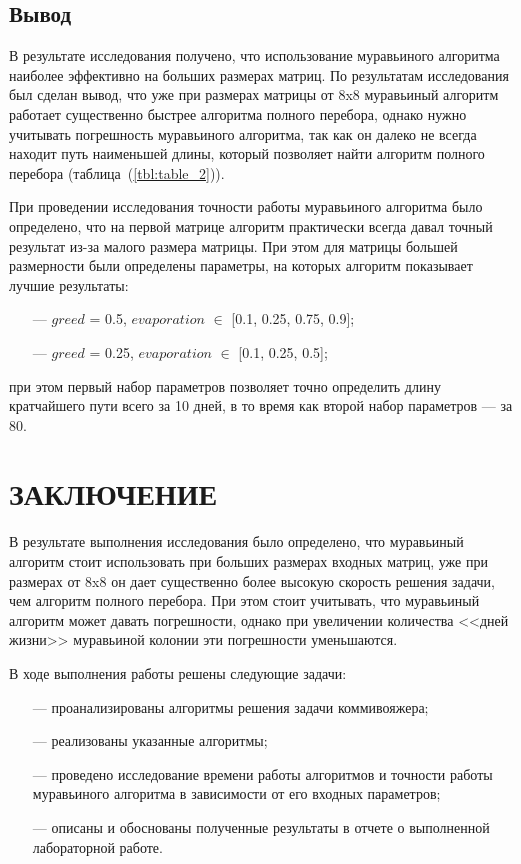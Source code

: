 \documentclass{bmstu}
\begin{document}
\section*{Вывод}
В результате исследования получено, что использование муравьиного алгоритма наиболее эффективно на больших размерах матриц. По результатам исследования был сделан вывод, что уже при размерах матрицы от 8x8 муравьиный алгоритм работает существенно быстрее алгоритма полного перебора, однако нужно учитывать погрешность муравьиного алгоритма, так как он далеко не всегда находит путь наименьшей длины, который позволяет найти алгоритм полного перебора (таблица~(\ref{tbl:table_2})).
\par При проведении исследования точности работы муравьиного алгоритма было определено, что на первой матрице алгоритм практически всегда давал точный результат из-за малого размера матрицы. При этом для матрицы большей размерности были определены параметры, на которых алгоритм показывает лучшие результаты:
\begin{itemize}
    \item [---] $greed$ = 0.5, $evaporation$ $\in$ [0.1, 0.25, 0.75, 0.9];
    \item [---] $greed$ = 0.25, $evaporation$ $\in$ [0.1, 0.25, 0.5];
\end{itemize}
при этом первый набор параметров позволяет точно определить длину кратчайшего пути всего за 10 дней, в то время как второй набор параметров --- за 80.

\chapter*{ЗАКЛЮЧЕНИЕ}

В результате выполнения исследования было определено, что муравьиный алгоритм стоит использовать при больших размерах входных матриц, уже при размерах от 8x8 он дает существенно более высокую скорость решения задачи, чем алгоритм полного перебора. При этом стоит учитывать, что муравьиный алгоритм может давать погрешности, однако при увеличении количества <<дней жизни>> муравьиной колонии эти погрешности уменьшаются.
\par В ходе выполнения работы решены следующие задачи:
\begin{itemize}
	\item[---] проанализированы алгоритмы решения задачи коммивояжера;
	\item[---] реализованы указанные алгоритмы;
	\item[---] проведено исследование времени работы алгоритмов и точности работы муравьиного алгоритма в зависимости от его входных параметров;
    \item[---] описаны и обоснованы полученные результаты в отчете о выполненной лабораторной работе.
\end{itemize}
\end{document}
